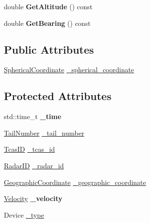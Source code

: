\begin{DoxyCompactItemize}
\item 
\hypertarget{class_surveillance_report_a6e46b7444a80bcb039eac5b6a4477c19}{}double {\bfseries Get\+Altitude} () const \label{class_surveillance_report_a6e46b7444a80bcb039eac5b6a4477c19}

\item 
\hypertarget{class_surveillance_report_ad3d46891a1bb3d7a1500f651a7cf28f7}{}double {\bfseries Get\+Bearing} () const \label{class_surveillance_report_ad3d46891a1bb3d7a1500f651a7cf28f7}

\end{DoxyCompactItemize}
\subsection*{Public Attributes}
\begin{DoxyCompactItemize}
\item 
\hyperlink{class_spherical_coordinate}{Spherical\+Coordinate} \hyperlink{class_surveillance_report_a4ea35b8925d95682e468f92b297e7cc6}{\+\_\+spherical\+\_\+coordinate}
\end{DoxyCompactItemize}
\subsection*{Protected Attributes}
\begin{DoxyCompactItemize}
\item 
\hypertarget{class_surveillance_report_a180b13630c6cfd3bba178e4120bd10e3}{}std\+::time\+\_\+t {\bfseries \+\_\+time}\label{class_surveillance_report_a180b13630c6cfd3bba178e4120bd10e3}

\item 
\hyperlink{class_tail_number}{Tail\+Number} \hyperlink{class_surveillance_report_a87dcfc53aefdb626b6d6968ee7d0fc88}{\+\_\+tail\+\_\+number}
\item 
\hyperlink{class_tcas_i_d}{Tcas\+I\+D} \hyperlink{class_surveillance_report_ab53661ea6069e7946b7092d962e8f5b7}{\+\_\+tcas\+\_\+id}
\item 
\hyperlink{class_radar_i_d}{Radar\+I\+D} \hyperlink{class_surveillance_report_ab8d269722a214afb6b27daad622e8ee5}{\+\_\+radar\+\_\+id}
\item 
\hyperlink{class_geographic_coordinate}{Geographic\+Coordinate} \hyperlink{class_surveillance_report_a1dde505984eed4842bf8859bfb8c2bd7}{\+\_\+geographic\+\_\+coordinate}
\item 
\hypertarget{class_surveillance_report_a0efe89f6578bffb862adc866974d7796}{}\hyperlink{class_velocity}{Velocity} {\bfseries \+\_\+velocity}\label{class_surveillance_report_a0efe89f6578bffb862adc866974d7796}

\item 
Device \hyperlink{class_surveillance_report_a5da1e71fef162b45aec2319056a896cb}{\+\_\+type}
\end{DoxyCompactItemize}


